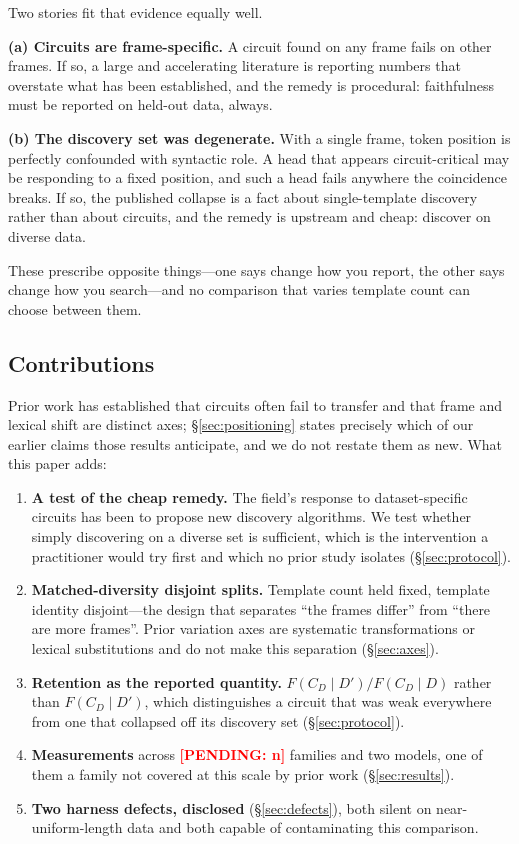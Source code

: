 \documentclass[11pt,a4paper]{article}
\newcounter{pendingcount}
\DeclareRobustCommand{\pending}[1]{\stepcounter{pendingcount}%
  \textcolor{red}{\textbf{[PENDING: #1]}}}
\newcommand{\FD}{F(C_D \!\mid\! D)}
\newcommand{\FDp}{F(C_D \!\mid\! D')}
\begin{document}
Two stories fit that evidence equally well.

\textbf{(a) Circuits are frame-specific.} A circuit found on any frame fails on other
frames. If so, a large and accelerating literature is reporting numbers that overstate
what has been established, and the remedy is procedural: faithfulness must be reported
on held-out data, always.

\textbf{(b) The discovery set was degenerate.} With a single frame, token position is
perfectly confounded with syntactic role. A head that appears circuit-critical may be
responding to a fixed position, and such a head fails anywhere the coincidence breaks.
If so, the published collapse is a fact about single-template discovery rather than
about circuits, and the remedy is upstream and cheap: discover on diverse data.

These prescribe opposite things---one says change how you report, the other says
change how you search---and no comparison that varies template count can choose
between them.

\subsection{Contributions}

Prior work has established that circuits often fail to transfer and that frame and
lexical shift are distinct axes; \S\ref{sec:positioning} states precisely which of our
earlier claims those results anticipate, and we do not restate them as new. What this
paper adds:

\begin{enumerate}
  \item \textbf{A test of the cheap remedy.} The field's response to dataset-specific
    circuits has been to propose new discovery algorithms. We test whether simply
    discovering on a diverse set is sufficient, which is the intervention a
    practitioner would try first and which no prior study isolates
    (\S\ref{sec:protocol}).
  \item \textbf{Matched-diversity disjoint splits.} Template count held fixed, template
    identity disjoint---the design that separates ``the frames differ'' from ``there
    are more frames''. Prior variation axes are systematic transformations or lexical
    substitutions and do not make this separation (\S\ref{sec:axes}).
  \item \textbf{Retention as the reported quantity.} $\FDp/\FD$ rather than $\FDp$,
    which distinguishes a circuit that was weak everywhere from one that collapsed off
    its discovery set (\S\ref{sec:protocol}).
  \item \textbf{Measurements} across \pending{n} families and two models, one of them
    a family not covered at this scale by prior work (\S\ref{sec:results}).
  \item \textbf{Two harness defects, disclosed} (\S\ref{sec:defects}), both silent on
    near-uniform-length data and both capable of contaminating this comparison.
\end{enumerate}
\end{document}
